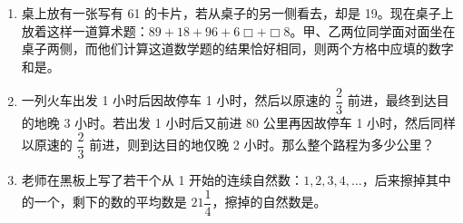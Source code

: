 \documentclass[UTF8,12pt,a4paper]{ctexart}
\newcommand{\BottomWriteSpace}{0.5cm}
\newenvironment{OnePageEightFill}{
  \small
  \vspace*{0pt}
  \begin{enumerate}[leftmargin=*, itemsep=0pt, topsep=0pt, parsep=0pt, partopsep=0pt]
  \setlength{\parskip}{0pt}
}{
  \end{enumerate}
  \vspace*{\BottomWriteSpace}
  \normalsize
  \newpage
}
\newcommand{\Q}[1]{\item #1\par\vfill}
\newcommand{\Qlast}[1]{\item #1\par}
\begin{document}
\begin{OnePageEightFill}
\Q{桌上放有一张写有 61 的卡片，若从桌子的另一侧看去，却是 19。现在桌子上放着这样一道算术题：$89 + 18 + 96 + 6\Box + \Box8$。甲、乙两位同学面对面坐在桌子两侧，而他们计算这道数学题的结果恰好相同，则两个方格中应填的数字和是\underline{\hspace{3em}}。}

\Q{一列火车出发 1 小时后因故停车 1 小时，然后以原速的 $\dfrac{2}{3}$ 前进，最终到达目的地晚 3 小时。若出发 1 小时后又前进 80 公里再因故停车 1 小时，然后同样以原速的 $\dfrac{2}{3}$ 前进，则到达目的地仅晚 2 小时。那么整个路程为多少公里？}

\Qlast{老师在黑板上写了若干个从 1 开始的连续自然数：$1, 2, 3, 4, \dots$，后来擦掉其中的一个，剩下的数的平均数是 $21\dfrac{1}{4}$，擦掉的自然数是\underline{\hspace{3em}}。}

\end{OnePageEightFill}

\end{document}
